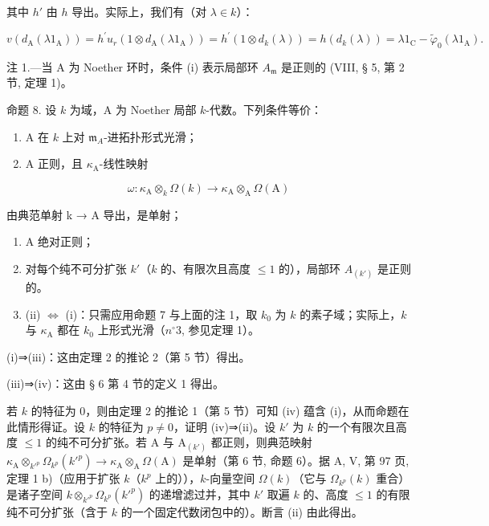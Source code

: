 其中 \(h'\) 由 \(h\) 导出。实际上，我们有（对 \(\lambda \in k\)）：

\[
v \left(d _ {\mathrm{A}} \left(\lambda 1 _ {\mathrm{A}}\right)\right) = h ^ {\prime} u _ {r} \left(1 \otimes d _ {\mathrm{A}} \left(\lambda 1 _ {\mathrm{A}}\right)\right) = h ^ {\prime} \left(1 \otimes d _ {k} (\lambda)\right) = h \left(d _ {k} (\lambda)\right) = \lambda 1 _ {\mathrm{C}} - \tilde {\varphi} _ {0} \left(\lambda 1 _ {\mathrm{A}}\right).
\]

注 1.—当 A 为 Noether 环时，条件 (i) 表示局部环 \(A_{\mathfrak{m}}\) 是正则的 (VIII, § 5, 第 2 节, 定理 1)。

命题 8. 设 \(k\) 为域，A 为 Noether 局部 \(k\)-代数。下列条件等价：

\begin{enumerate}
\def\labelenumi{(\roman{enumi})}
\item
  A 在 \(k\) 上对 \(\mathfrak{m}_{A}\)-进拓扑形式光滑；
\item
  A 正则，且 \(\kappa_{\mathrm{A}}\)-线性映射
\end{enumerate}

\[
\omega : \kappa_ {\mathrm{A}} \otimes_ {k} \Omega (k) \longrightarrow \kappa_ {\mathrm{A}} \otimes_ {\mathrm{A}} \Omega (\mathrm{A})
\]

由典范单射 k → A 导出，是单射；

\begin{enumerate}
\def\labelenumi{(\roman{enumi})}
\setcounter{enumi}{2}
\item
  A 绝对正则；
\item
  对每个纯不可分扩张 \(k'\)（\(k\) 的、有限次且高度 \(\leqslant 1\) 的），局部环 \(A_{(k')}\) 是正则的。
\item
  (ii) \(\Leftrightarrow\) (i)：只需应用命题 7 与上面的注 1，取 \(k_{0}\) 为 \(k\) 的素子域；实际上，\(k\) 与 \(\kappa_{\mathrm{A}}\) 都在 \(k_{0}\) 上形式光滑（\(n^{\circ}3\), 参见定理 1）。
\end{enumerate}

(i)⇒(iii)：这由定理 2 的推论 2（第 5 节）得出。

(iii)⇒(iv)：这由 § 6 第 4 节的定义 1 得出。

若 \(k\) 的特征为 0，则由定理 2 的推论 1（第 5 节）可知 (iv) 蕴含 (i)，从而命题在此情形得证。设 \(k\) 的特征为 \(p \neq 0\)，证明 (iv)⇒(ii)。设 \(k'\) 为 \(k\) 的一个有限次且高度 \(\leqslant 1\) 的纯不可分扩张。若 A 与 \(\mathrm{A}_{(k')}\) 都正则，则典范映射 \(\kappa_{\mathrm{A}} \otimes_{k'^{p}} \Omega_{k^{p}}(k'^{p}) \longrightarrow \kappa_{\mathrm{A}} \otimes_{\mathrm{A}} \Omega(\mathrm{A})\) 是单射（第 6 节, 命题 6）。据 A, V, 第 97 页, 定理 1 b)（应用于扩张 \(k\)（\(k^{p}\) 上的）），\(k\)-向量空间 \(\Omega(k)\)（它与 \(\Omega_{k^{p}}(k)\) 重合）是诸子空间 \(k \otimes_{k'^{p}} \Omega_{k^{p}}(k'^{p})\) 的递增滤过并，其中 \(k'\) 取遍 \(k\) 的、高度 \(\leqslant 1\) 的有限纯不可分扩张（含于 \(k\) 的一个固定代数闭包中的）。断言 (ii) 由此得出。

